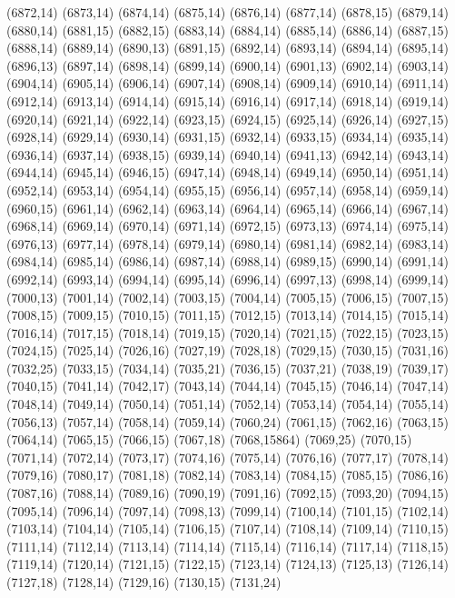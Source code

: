 (6872,14)
(6873,14)
(6874,14)
(6875,14)
(6876,14)
(6877,14)
(6878,15)
(6879,14)
(6880,14)
(6881,15)
(6882,15)
(6883,14)
(6884,14)
(6885,14)
(6886,14)
(6887,15)
(6888,14)
(6889,14)
(6890,13)
(6891,15)
(6892,14)
(6893,14)
(6894,14)
(6895,14)
(6896,13)
(6897,14)
(6898,14)
(6899,14)
(6900,14)
(6901,13)
(6902,14)
(6903,14)
(6904,14)
(6905,14)
(6906,14)
(6907,14)
(6908,14)
(6909,14)
(6910,14)
(6911,14)
(6912,14)
(6913,14)
(6914,14)
(6915,14)
(6916,14)
(6917,14)
(6918,14)
(6919,14)
(6920,14)
(6921,14)
(6922,14)
(6923,15)
(6924,15)
(6925,14)
(6926,14)
(6927,15)
(6928,14)
(6929,14)
(6930,14)
(6931,15)
(6932,14)
(6933,15)
(6934,14)
(6935,14)
(6936,14)
(6937,14)
(6938,15)
(6939,14)
(6940,14)
(6941,13)
(6942,14)
(6943,14)
(6944,14)
(6945,14)
(6946,15)
(6947,14)
(6948,14)
(6949,14)
(6950,14)
(6951,14)
(6952,14)
(6953,14)
(6954,14)
(6955,15)
(6956,14)
(6957,14)
(6958,14)
(6959,14)
(6960,15)
(6961,14)
(6962,14)
(6963,14)
(6964,14)
(6965,14)
(6966,14)
(6967,14)
(6968,14)
(6969,14)
(6970,14)
(6971,14)
(6972,15)
(6973,13)
(6974,14)
(6975,14)
(6976,13)
(6977,14)
(6978,14)
(6979,14)
(6980,14)
(6981,14)
(6982,14)
(6983,14)
(6984,14)
(6985,14)
(6986,14)
(6987,14)
(6988,14)
(6989,15)
(6990,14)
(6991,14)
(6992,14)
(6993,14)
(6994,14)
(6995,14)
(6996,14)
(6997,13)
(6998,14)
(6999,14)
(7000,13)
(7001,14)
(7002,14)
(7003,15)
(7004,14)
(7005,15)
(7006,15)
(7007,15)
(7008,15)
(7009,15)
(7010,15)
(7011,15)
(7012,15)
(7013,14)
(7014,15)
(7015,14)
(7016,14)
(7017,15)
(7018,14)
(7019,15)
(7020,14)
(7021,15)
(7022,15)
(7023,15)
(7024,15)
(7025,14)
(7026,16)
(7027,19)
(7028,18)
(7029,15)
(7030,15)
(7031,16)
(7032,25)
(7033,15)
(7034,14)
(7035,21)
(7036,15)
(7037,21)
(7038,19)
(7039,17)
(7040,15)
(7041,14)
(7042,17)
(7043,14)
(7044,14)
(7045,15)
(7046,14)
(7047,14)
(7048,14)
(7049,14)
(7050,14)
(7051,14)
(7052,14)
(7053,14)
(7054,14)
(7055,14)
(7056,13)
(7057,14)
(7058,14)
(7059,14)
(7060,24)
(7061,15)
(7062,16)
(7063,15)
(7064,14)
(7065,15)
(7066,15)
(7067,18)
(7068,15864)
(7069,25)
(7070,15)
(7071,14)
(7072,14)
(7073,17)
(7074,16)
(7075,14)
(7076,16)
(7077,17)
(7078,14)
(7079,16)
(7080,17)
(7081,18)
(7082,14)
(7083,14)
(7084,15)
(7085,15)
(7086,16)
(7087,16)
(7088,14)
(7089,16)
(7090,19)
(7091,16)
(7092,15)
(7093,20)
(7094,15)
(7095,14)
(7096,14)
(7097,14)
(7098,13)
(7099,14)
(7100,14)
(7101,15)
(7102,14)
(7103,14)
(7104,14)
(7105,14)
(7106,15)
(7107,14)
(7108,14)
(7109,14)
(7110,15)
(7111,14)
(7112,14)
(7113,14)
(7114,14)
(7115,14)
(7116,14)
(7117,14)
(7118,15)
(7119,14)
(7120,14)
(7121,15)
(7122,15)
(7123,14)
(7124,13)
(7125,13)
(7126,14)
(7127,18)
(7128,14)
(7129,16)
(7130,15)
(7131,24)
